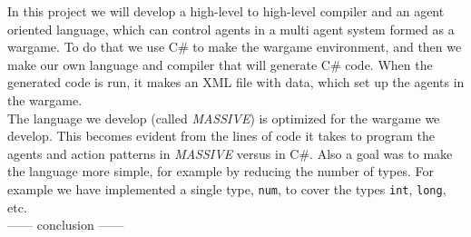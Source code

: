 In this project we will develop a high-level to high-level compiler and an agent oriented language, which can control agents in a multi agent system formed as a wargame. To do that we use C\# to make the wargame environment, and then we make our own language and compiler that will generate C\# code. When the generated code is run, it makes an XML file with data, which set up the agents in the wargame.\\ \indent
The language we develop (called \textit{MASSIVE}) is optimized for the wargame we develop. This becomes evident from the lines of code it takes to program the agents and action patterns in \textit{MASSIVE} versus in C\#. Also a goal was to make the language more simple, for example by reducing the number of types. For example we have implemented a single type, \texttt{num}, to cover the types \texttt{int}, \texttt{long}, etc. \\ \indent
------ conclusion ------